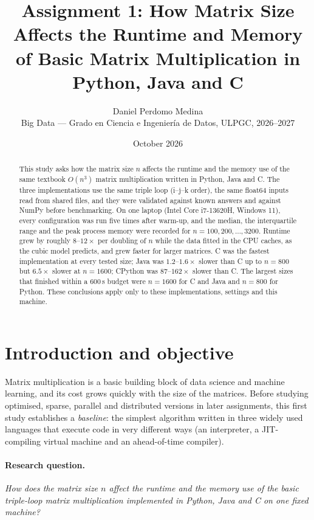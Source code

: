 \documentclass[11pt,a4paper]{article}
\title{\textbf{Assignment 1: How Matrix Size Affects the Runtime and Memory\\
of Basic Matrix Multiplication in Python, Java and C}}
\author{Daniel Perdomo Medina\\
Big Data --- Grado en Ciencia e Ingenier\'ia de Datos, ULPGC, 2026--2027}
\date{October 2026}
\begin{document}
\maketitle

\begin{abstract}
\noindent
This study asks how the matrix size $n$ affects the runtime and the memory use of
the same textbook $O(n^3)$ matrix multiplication written in Python, Java and C.
The three implementations use the same triple loop (i--j--k order), the same
float64 inputs read from shared files, and they were validated against known
answers and against NumPy before benchmarking. On one laptop (Intel Core i7-13620H,
Windows 11), every configuration was run five times after warm-up, and the median,
the interquartile range and the peak process memory were recorded for
$n = 100, 200, \dots, 3200$. Runtime grew by roughly $8$--$12\times$ per doubling of
$n$ while the data fitted in the CPU caches, as the cubic model predicts, and grew
faster for larger matrices. C was the fastest implementation at every tested size;
Java was $1.2$--$1.6\times$ slower than C up to $n = 800$ but $6.5\times$ slower at
$n = 1600$; CPython was $87$--$162\times$ slower than C. The largest sizes that
finished within a 600\,s budget were $n = 1600$ for C and Java and $n = 800$ for Python.
These conclusions apply only to these implementations, settings and this machine.
\end{abstract}

\section{Introduction and objective}

Matrix multiplication is a basic building block of data science and machine learning,
and its cost grows quickly with the size of the matrices. Before studying optimised,
sparse, parallel and distributed versions in later assignments, this first study
establishes a \emph{baseline}: the simplest algorithm written in three widely used
languages that execute code in very different ways (an interpreter, a JIT-compiling
virtual machine and an ahead-of-time compiler).

\paragraph{Research question.} \emph{How does the matrix size $n$ affect the runtime
and the memory use of the basic triple-loop matrix multiplication implemented in
Python, Java and C on one fixed machine?}
\end{document}
